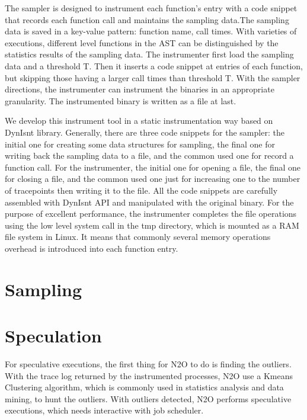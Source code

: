 The sampler is designed to instrument each function’s entry with a code snippet that records each function call and maintains the sampling data.The sampling data is saved in a key-value pattern: function name, call times. With varieties of executions, different level functions in the AST can be distinguished by the statistics results of the sampling data. The instrumenter first load the sampling data and a threshold T. Then it inserts a code snippet at entries of each function, but skipping those having a larger call times than threshold T. With the sampler directions, the instrumenter can instrument the binaries in an appropriate granularity. The instrumented binary is written as a file at last. 

We develop this instrument tool in a static instrumentation way based on DynIsnt library. Generally, there are three code snippets for the sampler: the initial one for creating some data structures for sampling, the final one for writing back the sampling data to a file, and the common used one for record a function call. For the instrumenter, the initial one for opening a file, the final one for closing a file, and the common used one just for increasing one to the number of tracepoints then writing it to the file. All the code snippets are carefully assembled with DynIsnt API and manipulated with the original binary. For the purpose of excellent performance, the instrumenter completes the file operations using the low level system call in the tmp directory, which is mounted as a RAM file system in Linux. It means that commonly several memory operations overhead is introduced into each function entry.

\section{Sampling}

\section{Speculation}
For speculative executions, the first thing for N2O to do is finding the outliers. With the trace log returned by the instrumented processes, N2O use a Kmeans Clustering algorithm, which is commonly used in statistics analysis and data mining, to hunt the outliers. With outliers detected, N2O performs speculative executions, which needs interactive with job scheduler. 

